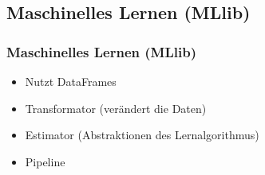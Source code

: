 \documentclass[hyperref={pdfpagelabels=false}]{beamer}
\begin{document}
\subsection{Maschinelles Lernen (MLlib)}
\begin{frame} [t]
\frametitle{Maschinelles Lernen (MLlib)}

\begin{itemize}
	\item Nutzt DataFrames
	\item Transformator (verändert die Daten)
	\item Estimator (Abstraktionen des Lernalgorithmus)
	\item Pipeline
\end{itemize}

 {
	\begin{figure}[h]
		\centering
	\end{figure}
}

\end{frame}
\end{document}
